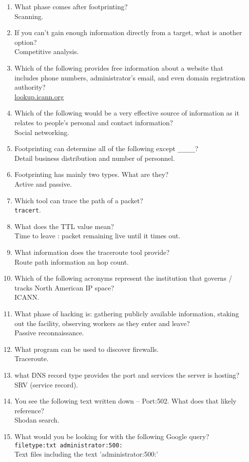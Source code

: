 \begin{enumerate}
    \item What phase comes after footprinting?\\Scanning.
    \item If you can't gain enough information directly from a target, what is another option?\\Competitive analysis.
    \item Which of the following provides free information about a website that includes phone numbers, administrator's email, and even domain registration authority?\\\url{lookup.icann.org}
    \item Which of the following would be a very effective source of information as it relates to people's personal and contact information?\\Social networking.
    \item Footprinting can determine all of the following except \verb|_____|?\\Detail business distribution and number of personnel.
    \item Footprinting has mainly two types. What are they?\\Active and passive.
    \item Which tool can trace the path of a packet?\\\verb|tracert|.
    \item What does the TTL value mean?\\Time to leave : packet remaining live until it times out.
    \item What information does the traceroute tool provide?\\Route path information an hop count.
    \item Which of the following acronyms represent the institution that governs / tracks North American IP space?\\ICANN.
    \item What phase of hacking is: gathering publicly available information, staking out the facility, observing workers as they enter and leave?\\Passive reconnaissance.
    \item What program can be used to discover firewalls.\\Traceroute.
    \item what DNS record type provides the port and services the server is hosting?\\SRV (service record).
    \item You see the following text written down -- Port:502. What does that likely reference?\\Shodan search.
    \item What would you be looking for with the following Google query? \verb|filetype:txt administrator:500:|\\Text files including the text 'administrator:500:'
\end{enumerate}

